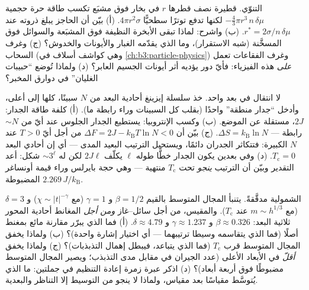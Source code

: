 \begin{exercise}[$\star\star$]\label{exo:b3:phase-transitions:9}
التنوّي. قطيرة نصف قطرها $r$ في بخار فوق مشبَع
تكسب طاقة حرة حجمية $-\tfrac43\pi r^3\,n\,\delta\mu$ لكنها تدفع
توترًا سطحيًّا $4\pi r^2\sigma$. (أ) بيّن أن الحاجز يبلغ ذروته عند
$r^* = 2\sigma/n\,\delta\mu$. (ب) واشرح: لماذا تبقى الأبخرة
النظيفة فوق المشبَعة والسوائل فوق المسخَّنة
(شبه الاستقرار)، وما الذي يقدّمه الغبار والأيونات والخدوش؟
(ج) وغرف السحاب (وهي كواشف أسلاف في
\cref{ch:b3:particle-physics}) وغرف الفقاعات تعمل \emph{على} هذه
الفيزياء: فأيّ دور يؤديه أثر أيونات الجسيم العابر؟ (د) ولماذا
تُوضع ``حبيبات الغليان'' في دوارق المخبر؟
\end{exercise}

\begin{exercise}[$\star\star\star$]\label{exo:b3:phase-transitions:10}
لا انتقال في بعد واحد. خذ سلسلة إيزينغ أحادية البعد من $N$
سبينًا، كلها إلى أعلى، وأدخل ``جدار منطقة'' واحدًا (بقلب كل السبينات وراء
رابطة ما). (أ) كلفة طاقة الجدار: $2J$،
مستقلة عن الموضع. (ب) وكسب الإنتروبيا: يستطيع الجدار الجلوس عند
أيّ من $\sim N$ رابطة --- $\Delta S = k_{\text{B}}\ln N$. (ج)
بيّن أن $\Delta F = 2J - k_{\text{B}}T\ln N < 0$ من أجل أيّ $T > 0$ عند
$N$ الكبيرة: فتتكاثر الجدران دائمًا، ويستحيل الترتيب البعيد
المدى --- أي إن  أحادي البعد $T_{\text{c}} = 0$. (د) وفي
بعدين يكون الجدار خطًّا طوله $\ell$ يكلّف $2J\ell$ لكن له
$\sim3^\ell$ شكل: أعد التقدير وبيّن أن الترتيب
\emph{ينجو} تحت $T_{\text{c}}$ منتهية --- وهي
حجة بايرلس وراء قيمة أونساغر المضبوطة $2.269\,J/k_{\text{B}}$.
\end{exercise}

\begin{exercise}[$\star\star\star$]\label{exo:b3:phase-transitions:11}
الشمولية مدقَّقةً. يتنبأ المجال المتوسط بالقيم $\beta = 1/2$ و $\gamma
= 1$ (مع $\chi \sim |t|^{-\gamma}$) و $\delta = 3$ (مع $m \sim h^{1/3}$
عند $T_{\text{c}}$). والمقيس، من أجل  سائل--غاز
\emph{ومن أجل} المغانط أحادية المحور ثلاثية البعد: $\beta
\approx 0.326$ و $\gamma \approx 1.237$ و $\delta \approx 4.79$.
(أ) فما الذي يبرّر مقارنة مائع بمغنط أصلًا (فما الذي
يتقاسمه وسيطا ترتيبهما --- أي اختيار إشارة واحدة)؟ (ب)
ولماذا يخفق المجال المتوسط قرب $T_{\text{c}}$ (فما الذي يتباعد،
فيبطل إهمال التذبذبات)؟ (ج) ولماذا يخفق
\emph{أقلّ} في الأبعاد الأعلى (عدد الجيران في مقابل مدى
التذبذب؛ ويصير المجال المتوسط مضبوطًا فوق أربعة
أبعاد)؟ (د) اذكر عبرة زمرة إعادة التنظيم في جملتين:
ما الذي يُتوسَّط مقياسًا بعد مقياس، ولماذا لا ينجو من التوسيط إلا
التناظر والبعدية.
\end{exercise}

